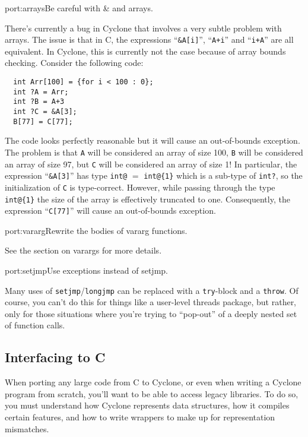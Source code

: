 \begin{porta}{port:arrays}{Be careful with \& and arrays.}

There's currently a bug in Cyclone that involves a very subtle problem
with arrays.  The issue is that in C, the expressions
``\texttt{\&A[i]}'', ``\texttt{A+i}'' and ``\texttt{i+A}'' are
all equivalent.  In Cyclone, this is currently not the case because
of array bounds checking.  Consider the following code:
\begin{verbatim}
  int Arr[100] = {for i < 100 : 0};
  int ?A = Arr;
  int ?B = A+3
  int ?C = &A[3];
  B[77] = C[77];
\end{verbatim}
The code looks perfectly reasonable but it will cause an out-of-bounds
exception.  The problem is that \texttt{A} will be considered an
array of size 100, \texttt{B} will be considered an array of size
97, but \texttt{C} will be considered an array of size 1!  In
particular, the expression ``\texttt{\&A[3]}'' has type
\texttt{int@} $=$ \texttt{int@\{1\}} which is a sub-type of
\texttt{int?}, so the initialization of \texttt{C} is type-correct.
However, while passing through the type \texttt{int@\{1\}} the
size of the array is effectively truncated to one.  Consequently,
the expression ``\texttt{C[77]}'' will cause an out-of-bounds
exception.  

\end{porta}

\begin{porta}{port:vararg}{Rewrite the bodies of vararg functions.}

See the section on varargs for more details.  
\end{porta}

\begin{porta}{port:setjmp}{Use exceptions instead of setjmp.}

Many uses of \texttt{setjmp}/\texttt{longjmp} can be replaced
with a \texttt{try}-block and a \texttt{throw}.  Of course,
you can't do this for things like a user-level threads package,
but rather, only for those situations where you're trying
to ``pop-out'' of a deeply nested set of function calls.
\end{porta}

\subsection{Interfacing to C}

When porting any large code from C to Cyclone, or even when writing
a Cyclone program from scratch, you'll want to be able to access
legacy libraries.  To do so, you must understand how Cyclone
represents data structures, how it compiles certain features,
and how to write wrappers to make up for representation mismatches.

